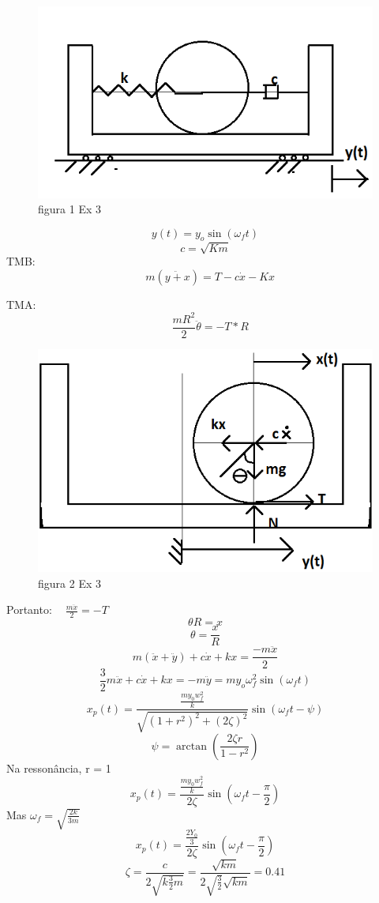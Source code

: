 \documentclass[a4paper, 12pt]{article}
\begin{document}
\begin{figure}[h]
\begin{center}
\includegraphics[scale=0.6]{./fig/5.png}
\caption{\label{fig:tur}figura 1  Ex 3} 
\end{center}
\end{figure}

\[y(t)=y_{o}\sin(\omega_{f}t)\]
\[c = \sqrt{Km}\]
TMB:\[\ \ \ \  m(\ddot{y+x}) = T - c\dot{x}-Kx \]

TMA:\[\ \ \ \  \frac{mR^{2}}{2}\ddot{\theta} = -T*R \]
\begin{figure}[h]
\begin{center}
\includegraphics[scale=0.5]{./fig/6.png}
\caption{\label{fig:tur}figura 2  Ex 3} 
\end{center}
\end{figure}

Portanto: $\ \ \ \  \frac{m\ddot{x}}{2}=-T $
	\[ \theta R=x \]
	\[\theta = \frac{x}{R}\]
	\[	m(\ddot{x}+\ddot{y})+c\dot{x}+kx=\frac{-m\ddot{x}}{2}\]
	\[\frac{3}{2}m\ddot{x}+c\dot{x}+kx=-m\ddot{y}=my_{o}\omega_{f}^{2}\sin(\omega_{f}t)\]
	\[x_{p}(t)=\frac{\frac{my_{0}w_{f}^{2}}{k}}{\sqrt{(1+r^{2})^{2}+(2\zeta)^{2}}}\sin(\omega_{f}t-\psi)\]
\[	\psi=\arctan(\frac{2\zeta r}{1-r^{2}})\]
	Na ressonância, r = 1
	\[x_{p}(t)=\frac{\frac{my_{0}w_{f}^{2}}{k}}{2\zeta}\sin(\omega_{f}t-\frac{\pi}{2})\]
	Mas $\omega_{f}=\sqrt{\frac{2k}{3m}}$  
	\[	x_{p}(t)=\frac{\frac{2Y_{0}}{3}}{2\zeta}\sin(\omega_{f}t-\frac{\pi}{2})\]
\[	\zeta=\frac{c}{2\sqrt{k\frac{3}{2}m}} = \frac{\sqrt{km}}{2\sqrt{\frac{3}{2}}\sqrt{km}}=0.41\]
\end{document}
